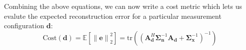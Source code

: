 \documentclass{article}
\providecommand{\norm}[1]{\left\lVert#1\right\rVert}
\begin{document}
Combining the above equations, we can now write a cost metric which lets us evalute
the expected reconstruction error for a particular measurement configuration $\bm{d}$:
\begin{equation}
\text{Cost}(\bm{d}) = \mathbb{E}[\norm{\bm{e}}_2^2] = \text{tr}\left(\left( \bm{A}_{\bm{d}}^H\bm{\Sigma}_{\bm{n}}^{-1} \bm{A}_{\bm{d}} +
    \bm{\Sigma}_{\bm{x}}^{-1}\right)^{-1}\right)
\end{equation}



\end{document}

